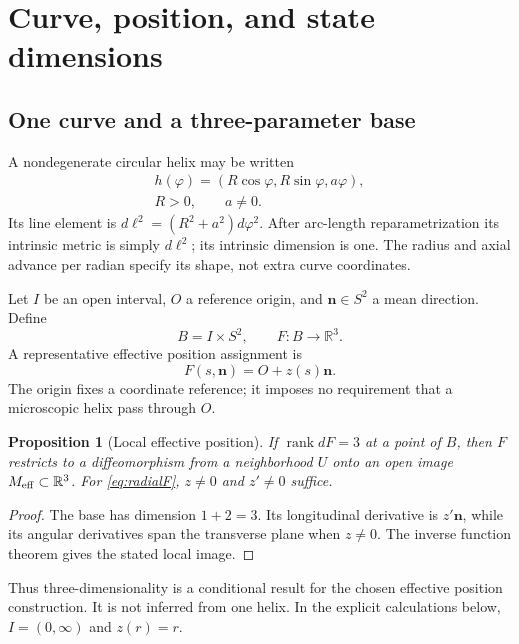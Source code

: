 \documentclass[11pt]{article}
\newtheorem{proposition}{Proposition}
\newcommand{\R}{\mathbb R}
\newcommand{\n}{\bm n}
\begin{document}
\section{Curve, position, and state dimensions}

\subsection{One curve and a three-parameter base}

A nondegenerate circular helix may be written
\begin{equation}
 \begin{gathered}
 h(\varphi)=(R\cos\varphi,R\sin\varphi,a\varphi),\\
 R>0,\qquad a\ne0.
 \end{gathered}
\end{equation}
Its line element is $d\ell^2=(R^2+a^2)d\varphi^2$. After arc-length reparametrization its intrinsic metric is simply $d\ell^2$; its intrinsic dimension is one. The radius and axial advance per radian specify its shape, not extra curve coordinates.

Let $I$ be an open interval, $O$ a reference origin, and $\n\in S^2$ a mean direction. Define
\begin{equation}
 B=I\times S^2,\qquad F:B\longrightarrow\R^3.
 \label{eq:F}
\end{equation}
A representative effective position assignment is
\begin{equation}
 F(s,\n)=O+z(s)\n.
 \label{eq:radialF}
\end{equation}
The origin fixes a coordinate reference; it imposes no requirement that a microscopic helix pass through $O$.

\begin{proposition}[Local effective position]
If $\operatorname{rank}dF=3$ at a point of $B$, then $F$ restricts to a diffeomorphism from a neighborhood $U$ onto an open image $M_{\rm eff}\subset\R^3$. For \eqref{eq:radialF}, $z\ne0$ and $z'\ne0$ suffice.
\end{proposition}
\begin{proof}
The base has dimension $1+2=3$. Its longitudinal derivative is $z'\n$, while its angular derivatives span the transverse plane when $z\ne0$. The inverse function theorem gives the stated local image.
\end{proof}
Thus three-dimensionality is a conditional result for the chosen effective position construction. It is not inferred from one helix. In the explicit calculations below, $I=(0,\infty)$ and $z(r)=r$.
\end{document}
